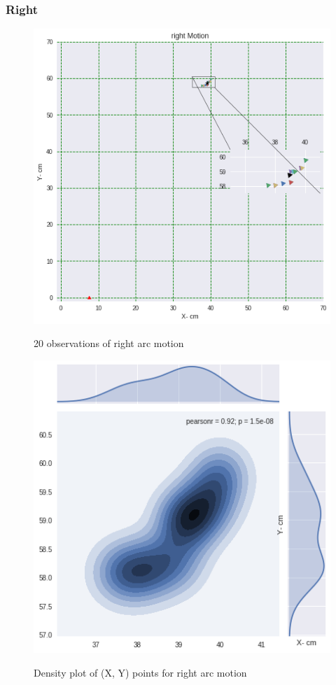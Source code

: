 \documentclass[11pt,a4paper]{article}
\begin{document}
\begin{itemize}
		\subsubsection{Right}
		\begin{figure}[H]
			\centering	
			\includegraphics[width=1.2\linewidth]{right_cm}
			\label{fig:right}
			\caption{20 observations of right arc motion}
		\end{figure}
		
		\begin{figure}[H]
			\centering	
			\includegraphics[width=0.8\linewidth]{rightG}
			\label{fig:sub1}
			\caption{Density plot of (X, Y) points for right arc motion}
		\end{figure}
		

\end{itemize}
\end{document}

